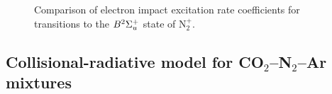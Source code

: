 {\begin{figure}[h!]
 \centering
 \caption{Comparison of electron impact excitation rate coefficients for transitions to the $B^2 \Sigma_u^+$ state of N$_2^+$.}
 \label{fig:K_EIE_N2_plus}
\end{figure}

\FloatBarrier

\subsection{Collisional-radiative model for CO$_2$--N$_2$--Ar mixtures}

}
